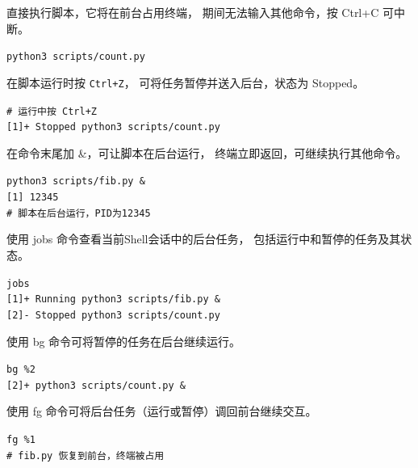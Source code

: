 \documentclass[a4paper, 12pt]{article}
\begin{document}
\begin{tcolorbox}[instancestyle, title=实例4：在前台运行Python脚本]
直接执行脚本，它将在前台占用终端，
期间无法输入其他命令，按 Ctrl+C 可中断。

\texttt{python3 scripts/count.py}
\end{tcolorbox}

\begin{tcolorbox}[instancestyle, title=实例5：暂停前台任务（Ctrl+Z）]
在脚本运行时按 \texttt{Ctrl+Z}，
可将任务暂停并送入后台，状态为 Stopped。

\texttt{\# 运行中按 Ctrl+Z} \\
\texttt{[1]+  Stopped                 python3 scripts/count.py}
\end{tcolorbox}

\begin{tcolorbox}[instancestyle, title=实例6：后台运行脚本（\&）]
在命令末尾加 \&，可让脚本在后台运行，
终端立即返回，可继续执行其他命令。

\texttt{python3 scripts/fib.py \&} \\
\texttt{[1] 12345} \\
\texttt{\# 脚本在后台运行，PID为12345}
\end{tcolorbox}

\begin{tcolorbox}[instancestyle, title=实例7：查看后台任务（jobs）]
使用 jobs 命令查看当前Shell会话中的后台任务，
包括运行中和暂停的任务及其状态。

\texttt{jobs} \\
\texttt{[1]+  Running    python3 scripts/fib.py \&} \\
\texttt{[2]-  Stopped    python3 scripts/count.py}
\end{tcolorbox}

\begin{tcolorbox}[instancestyle, title=实例8：恢复暂停任务到后台（bg）]
使用 bg 命令可将暂停的任务在后台继续运行。

\texttt{bg \%2} \\
\texttt{[2]+ python3 scripts/count.py \&}
\end{tcolorbox}

\begin{tcolorbox}[instancestyle, title=实例9：将后台任务调回前台（fg）]
使用 fg 命令可将后台任务（运行或暂停）调回前台继续交互。

\texttt{fg \%1} \\
\texttt{\# fib.py 恢复到前台，终端被占用}
\end{tcolorbox}
\end{document}
